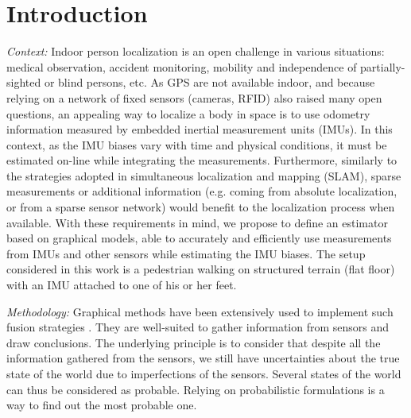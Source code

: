 
\section{Introduction}\label{sec:intro}

\textit{Context: }
Indoor person localization is an open challenge in various situations: 
medical observation, accident monitoring, mobility and independence of partially-sighted or blind persons, etc.
As GPS are not available indoor, and because relying on a network of fixed sensors (cameras, RFID) also raised many open questions, an appealing way to localize a body in space is to use odometry information measured by embedded inertial measurement units (IMUs).
In this context, as the IMU biases vary with time and physical conditions, it must be estimated on-line while integrating the measurements.
Furthermore, similarly to the strategies adopted in simultaneous localization and mapping (SLAM), sparse measurements or additional information (e.g. coming from absolute localization, or from a sparse sensor network) would benefit to the localization process when available.
With these requirements in mind, we propose to define an estimator based on graphical models, able to accurately and efficiently use measurements from IMUs and other sensors while estimating the IMU biases. %
The setup considered in this work  is a pedestrian walking on structured terrain (flat floor) with an IMU attached to one of his or her feet.

\textit{Methodology: }
Graphical methods have been extensively used to implement such fusion strategies \cite{Thrun:ijrr:2006,Kaess:itro:2008}.
They are well-suited to gather information from sensors
and draw conclusions. The underlying principle is to consider that despite all the information gathered from the sensors, we still have uncertainties about the true state of the world due to imperfections of the sensors.
Several states of the world can thus be considered as probable.
Relying on probabilistic formulations is a way to find out the most probable one. 

